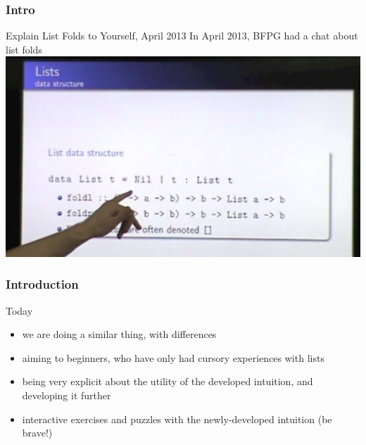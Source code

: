 \begin{frame}
\frametitle{Intro}
\begin{block}{Explain List Folds to Yourself, April 2013}
In April 2013, BFPG had a chat about list folds
\includegraphics[height=0.5\textheight]{image/list-folds-2013.png}
\end{block}
\end{frame}

\begin{frame}
\frametitle{Introduction}
\begin{block}{Today}
\begin{itemize}
\item<1-> we are doing a similar thing, with differences
\item<2-> aiming to beginners, who have only had cursory experiences with lists
\item<3-> being very explicit about the utility of the developed intuition, and developing it further
\item<4-> interactive exercises and puzzles with the newly-developed intuition (be brave!)
\end{itemize}
\end{block}
\end{frame}
